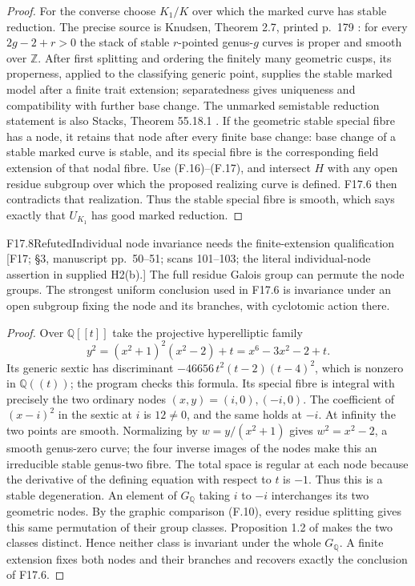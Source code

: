 \begin{proof}
For the converse choose $K_1/K$ over which the marked curve has
stable reduction. The precise source is Knudsen, Theorem 2.7,
printed p.\ 179 \cite{CF_Knudsen1983}: for every
$2g-2+r>0$ the stack of stable $r$-pointed genus-$g$ curves is
proper and smooth over $\mathbb Z$. After first splitting and
ordering the finitely many geometric cusps, its properness,
applied to the classifying generic point, supplies the stable
marked model after a finite trait extension; separatedness gives
uniqueness and compatibility with further base change. The
unmarked semistable reduction statement is also Stacks,
Theorem 55.18.1 \cite{CF_StacksStable}.
If the geometric stable special fibre has a node, it retains that
node after every finite base change: base change of a stable
marked curve is stable, and its special fibre is the corresponding
field extension of that nodal fibre. Use (F.16)--(F.17), and
intersect $H$ with any open residue subgroup over which the
proposed realizing curve is defined. F17.6 then contradicts
that realization. Thus the stable special fibre is smooth,
which says exactly that $U_{K_1}$ has good marked reduction.
\end{proof}

\begin{result}{F17.8}{Refuted}{Individual node invariance needs the finite-extension qualification}
\textup{[F17; \S3, manuscript pp.\ 50--51; scans 101--103;
the literal individual-node assertion in supplied H2(b).]}
The full residue Galois group can permute the node groups. The
strongest uniform conclusion used in F17.6 is invariance under
an open subgroup fixing the node and its branches, with cyclotomic
action there.
\end{result}
\begin{proof}
Over $\mathbb Q[[t]]$ take the projective hyperelliptic family
\[
 y^2=(x^2+1)^2(x^2-2)+t=x^6-3x^2-2+t.                       \tag{F.19}
\]
Its generic sextic has discriminant
$-46656\,t^2(t-2)(t-4)^2$, which is nonzero in
$\mathbb Q((t))$; the program checks this formula. Its special
fibre is integral with precisely the two ordinary nodes
$(x,y)=(i,0),(-i,0)$. The coefficient of $(x-i)^2$ in the
sextic at $i$ is $12\ne0$, and the same holds at $-i$.
At infinity the two points are smooth. Normalizing by
$w=y/(x^2+1)$ gives $w^2=x^2-2$, a smooth genus-zero curve;
the four inverse images of the nodes make this an irreducible
stable genus-two fibre. The total space is regular at each node
because the derivative of the defining equation with respect to
$t$ is $-1$. Thus this is a stable degeneration.
An element of $G_{\mathbb Q}$ taking $i$ to $-i$ interchanges
its two geometric nodes. By the graphic comparison (F.10), every
residue splitting gives this same permutation of their group
classes. Proposition 1.2 of \cite{CF_MochizukiComb2007} makes
the two classes distinct. Hence neither class is invariant under
the whole $G_{\mathbb Q}$. A finite extension fixes both nodes
and their branches and recovers exactly the conclusion of F17.6.
\end{proof}

